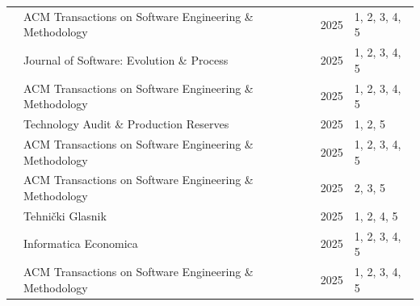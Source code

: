 {\begin{longtable}{p{2.2cm} p{7.6cm} c p{2.6cm}}
\cite{Qiu:2025ft} & ACM Transactions on Software Engineering \& Methodology & 2025 & 1, 2, 3, 4, 5 \\
\cite{Ramos:2025aa} & Journal of Software: Evolution \& Process & 2025 & 1, 2, 3, 4, 5 \\
\cite{Terragni:2025fa} & ACM Transactions on Software Engineering \& Methodology & 2025 & 1, 2, 3, 4, 5 \\
\cite{Tkachuk:2025dc} & Technology Audit \& Production Reserves & 2025 & 1, 2, 5 \\
\cite{Wang:2025rs} & ACM Transactions on Software Engineering \& Methodology & 2025 & 1, 2, 3, 4, 5 \\
\cite{Weyssow:2025ep} & ACM Transactions on Software Engineering \& Methodology & 2025 & 2, 3, 5 \\
\cite{Yoo:2025sa} & Tehnički Glasnik & 2025 & 1, 2, 4, 5 \\
\cite{Zamfiroiu:2025ec} & Informatica Economica & 2025 & 1, 2, 3, 4, 5 \\
\cite{Zhang:2025ea} & ACM Transactions on Software Engineering \& Methodology & 2025 & 1, 2, 3, 4, 5 \\

\end{longtable}
}
